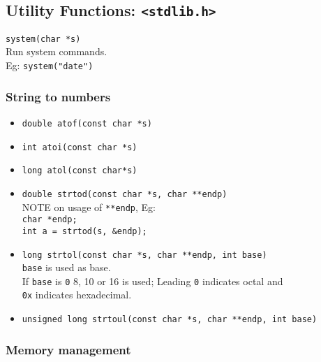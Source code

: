 \begin{multicols*}{3}
\subsection{Utility Functions: \texttt{<stdlib.h>}}

\texttt{system(char *s)}\\
\qquad Run system commands.\\
\qquad Eg: \texttt{system("date")}\\


\subsubsection{String to numbers}


\begin{itemize}
\item \texttt{double atof(const char *s)}\\
\item \texttt{int atoi(const char *s)}\\
\item \texttt{long atol(const char*s)}\\
\item \texttt{double strtod(const char *s, char **endp)}\\
NOTE on usage of \texttt{**endp}, Eg: \\
\texttt{char *endp;}\\
\texttt{int a = strtod(s, \&endp);}\\

\item \texttt{long strtol(const char *s, char **endp, int base)} \\
\texttt{base} is used as base. \\
If \texttt{base} is \texttt{0} 8, 10 or 16 is used; Leading \texttt{0} indicates octal and \\
\texttt{0x} indicates hexadecimal. \\

\item \texttt{unsigned long strtoul(const char *s, char **endp, int base)} \\
	
\end{itemize}

\subsubsection{Memory management}

\begin{itemize}
	

\end{itemize}
\end{multicols*}
